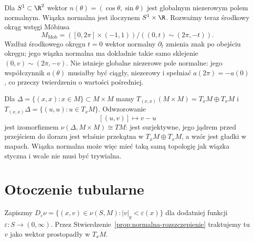 \begin{przyklad}
\label{prz:normalna-mobius}
Dla $S^1\subset\R^2$ wektor
$n(\theta)=(\cos\theta,\sin\theta)$
jest globalnym niezerowym polem normalnym.
Wiązka normalna jest iloczynem
$S^1\times\R$.
Rozważmy teraz środkowy okrąg wstęgi
Möbiusa
\[
 M_{\mathrm{Mob}}
 =([0,2\pi]\times(-1,1))/
            ((0,t)\sim(2\pi,-t)).
\]
Wzdłuż środkowego okręgu $t=0$
wektor normalny $\partial_t$ zmienia
znak po obejściu okręgu; jego wiązka
normalna ma dokładnie takie samo
sklejenie $(0,v)\sim(2\pi,-v)$.
Nie istnieje globalne niezerowe
pole normalne: jego współczynnik
$a(\theta)$ musiałby być ciągły,
niezerowy i spełniać
$a(2\pi)=-a(0)$, co przeczy
twierdzeniu o wartości pośredniej.
\end{przyklad}

\begin{przyklad}
\label{prz:normalna-diagonalna}
Dla $\Delta=\{(x,x):x\in M\}\subset M\times M$
mamy $T_{(x,x)}(M\times M)=T_xM\oplus T_xM$
i $T_{(x,x)}\Delta=\{(u,u):u\in T_xM\}$.
Odwzorowanie
\[
 [(u,v)]\longmapsto v-u
\]
jest izomorfizmem $\nu(\Delta,M\times M)\cong TM$:
jest surjektywne, jego jądrem przed
przejściem do ilorazu jest właśnie
przekątna w $T_xM\oplus T_xM$,
a wzór jest gładki w mapach.
Wiązka normalna może więc mieć
taką samą topologię jak wiązka styczna
i wcale nie musi być trywialna.
\end{przyklad}

\section{Otoczenie tubularne}
\label{sec:otoczenie-tubularne}

Zapiszmy
$D_\varepsilon\nu
=\{(x,v)\in\nu(S,M):|v|_g<\varepsilon(x)\}$
dla dodatniej funkcji $\varepsilon:S\to(0,\infty)$.
Przez Stwierdzenie~\ref{prop:normalna-rozszczepienie}
traktujemy tu $v$ jako wektor prostopadły
w $T_xM$.


